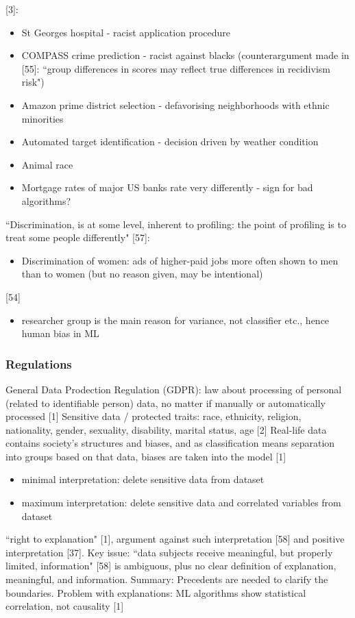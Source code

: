 [3]:
\begin{itemize}
	\item St Georges hospital - racist application procedure 
	\item COMPASS crime prediction - racist against blacks (counterargument made in [55]: ``group differences in scores may reflect true differences in recidivism risk")
	\item Amazon prime district selection - defavorising neighborhoods with ethnic minorities
	\item Automated target identification - decision driven by weather condition
	\item Animal race 
	\item Mortgage rates of major US banks rate very differently - sign for bad algorithms?
\end{itemize}
``Discrimination, is at some level, inherent to profiling: the point of profiling is to treat some people differently" [57]:
\begin{itemize}
	\item Discrimination of women: ads of higher-paid jobs more often shown to men than to women (but no reason given, may be intentional)
\end{itemize}
[54]
\begin{itemize}
	\item researcher group is the main reason for variance, not classifier etc., hence human bias in ML
\end{itemize}


\subsubsection{Regulations}
General Data Prodection Regulation (GDPR): law about processing of personal (related to identifiable person) data, no matter if manually or automatically processed [1] \newline
Sensitive data / protected traits: race, ethnicity, religion, nationality, gender, sexuality, disability, marital status, age [2] \newline
Real-life data contains society's structures and biases, and as classification means separation into groups based on that data, biases are taken into the model [1] \newline
\begin{itemize}
	\item minimal interpretation: delete sensitive data from dataset
	\item maximum interpretation: delete sensitive data and correlated variables from dataset
\end{itemize}
``right to explanation" [1], argument against such interpretation [58] and positive interpretation [37]. Key issue: ``data subjects receive meaningful, but properly limited, information" [58] is ambiguous, plus no clear definition of explanation, meaningful, and information. Summary: Precedents are needed to clarify the boundaries.\newline
Problem with explanations: ML algorithms show statistical correlation, not causality [1]\newline



